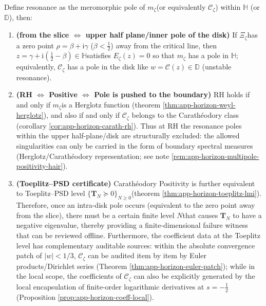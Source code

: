 \begin{proposition}\label{prop:xi-extreme-resonance-positivity}
Define resonance as the meromorphic pole of \(m_{\zeta}\) ​​(or equivalently \(\mathscr{C}_{\zeta}\)) within \(\mathbb{H}\) (or \(\mathbb{D}\)), then:
\begin{enumerate}
  \item \textbf{(from the slice \texorpdfstring{$\Longleftrightarrow$}{<->} upper half plane/inner pole of the disk)}
  If \(\Xi_{\zeta}\) ​​has a zero point \(\rho=\beta+\mathrm{i}\gamma\) (\(\beta<\tfrac12\)) away from the critical line, then
  \(z=\gamma+\mathrm{i}(\tfrac12-\beta)\in\mathbb{H}\) ​​satisfies \(E_{\zeta}(z)=0\) so that \(m_{\zeta}\) has a pole in \(\mathbb{H}\); equivalently, \(\mathscr{C}_{\zeta}\) has a pole in the disk like \(w=\mathcal{C}(z)\in\mathbb{D}\) (unstable resonance).
  \item \textbf{(RH \texorpdfstring{$\Longleftrightarrow$}{<->} Positive \texorpdfstring{$\Longleftrightarrow$}{<->} Pole is pushed to the boundary)}
  RH holds if and only if \(m_{\zeta}\) ​​is a Herglotz function (theorem \ref{thm:app-horizon-weyl-herglotz}), and also if and only if \(\mathscr{C}_{\zeta}\) belongs to the Carath\'eodory class (corollary \ref{cor:app-horizon-carath-rh}).
  Thus at RH the resonance poles within the upper half-plane/disk are structurally excluded: the allowed singularities can only be carried in the form of boundary spectral measures (Herglotz/Carath\'eodory representation; see note \ref{rem:app-horizon-multipole-positivity-hair}).
  \item ​​\textbf{(Toeplitz--PSD certificate)}
  Carath\'eodory Positivity is further equivalent to Toeplitz--PSD level \(\{\mathbf{T}_N\succeq 0\}_{N\ge 0}\) ​​(theorem \ref{thm:app-horizon-toeplitz-lmi}).
  Therefore, once an intra-disk pole occurs (equivalent to the zero point away from the slice), there must be a certain finite level \(N\) ​​that causes \(\mathbf{T}_N\) to have a negative eigenvalue, thereby providing a finite-dimensional failure witness that can be reviewed offline.
  Furthermore, the coefficient data at the Toeplitz level has complementary auditable sources: within the absolute convergence patch of \(|w|<1/3\), \(\mathscr{C}_{\zeta}\) can be audited item by item by Euler products/Dirichlet series (Theorem \ref{thm:app-horizon-euler-patch}); while in the local scope, the coefficients of \(\mathscr{C}_{\zeta}\) can also be explicitly generated by the local encapsulation of finite-order logarithmic derivatives at \(s=-\tfrac12\) (Proposition \ref{prop:app-horizon-coeff-local}).
\end{enumerate}
\end{proposition}

